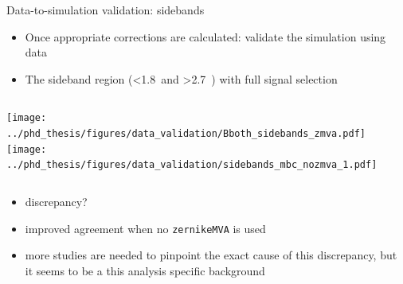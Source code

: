 \documentclass[xcolor=dvipsnames]{beamer}
\begin{document}
\begin{frame}{Data-to-simulation validation: sidebands}
   \scriptsize\centering
   \begin{itemize}
      \item Once appropriate corrections are calculated: validate the simulation using data
      \item The sideband region (\EB<1.8~\gev and \EB>2.7~\gev) with full signal selection
   \end{itemize}

   \begin{columns}
      \texttt{[image: ../phd\_thesis/figures/data\_validation/Bboth\_sidebands\_zmva.pdf]}
      \texttt{[image: ../phd\_thesis/figures/data\_validation/sidebands\_mbc\_nozmva\_1.pdf]}
   \end{columns}

   \begin{itemize}
      \item {} discrepancy?
      \item[\ra] improved agreement when no \texttt{zernikeMVA} is used
      \item[\ra] more studies are needed to pinpoint the exact cause of this discrepancy, but it seems to be a this analysis specific background
   \end{itemize}

\end{frame}
\end{document}
